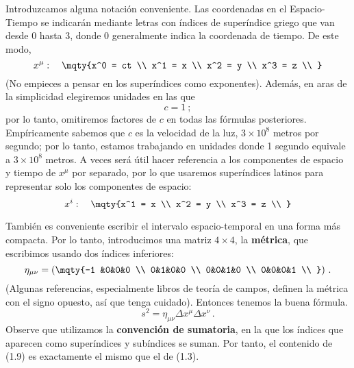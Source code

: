 \documentclass[11pt,b5paper,openany,twoside]{book}
\newcommand{\mn}{{\mu\nu}}
\begin{document}
Introduzcamos alguna notación conveniente.
Las coordenadas en el Espacio-Tiempo se indicarán mediante letras con índices de superíndice griego que van desde $0$ hasta $3$, donde $0$ generalmente indica la coordenada de tiempo.
De este modo,
\begin{equation}
x^\mu :\quad \mqty{x^0 = ct  \\  x^1 = x \\  x^2 = y \\  x^3 = z \\ }
\label{1.5}
\end{equation}
(No empieces a pensar en los superíndices como exponentes).
Además, en aras de la simplicidad elegiremos unidades en las que
\begin{equation}
c = 1 \ ;\label{1.6}
\end{equation}
por lo tanto, omitiremos factores de $c$ en todas las fórmulas posteriores.
Empíricamente sabemos que $c$ es la velocidad de la luz, $3\times 10^8$ metros por segundo; por lo tanto, estamos trabajando en unidades donde 1 segundo equivale a $3\times 10^8$ metros.
A veces será útil hacer referencia a los componentes de espacio y tiempo de $x^\mu$ por separado, por lo que usaremos superíndices latinos para representar solo los componentes de espacio:
\begin{equation}
x^i :\quad \mqty{x^1 = x \\  x^2 = y \\  x^3 = z \\ }\label{1.7}
\end{equation}

También es conveniente escribir el intervalo espacio-temporal en una forma más compacta.
Por lo tanto, introducimos una matriz $4\times 4$, la {\bf métrica}, que escribimos usando dos índices inferiores:
\begin{equation}
\eta_{\mn} = \left(\mqty{-1 &0&0&0 \\  0&1&0&0 \\
0&0&1&0  \\  0&0&0&1 \\ }\right)\,.\label{1.8}
\end{equation}
(Algunas referencias, especialmente libros de teoría de campos, definen la métrica con el signo opuesto, así que tenga cuidado).
Entonces tenemos la buena fórmula.
\begin{equation}
s^2 = \eta_\mn \Delta x^\mu \Delta x^\nu\,. \label{1.9}
\end{equation}
Observe que utilizamos la {\bf convención de sumatoria}, en la que los índices que aparecen como superíndices y subíndices se suman.
Por tanto, el contenido de (1.9) es exactamente el mismo que el de (1.3).
\end{document}
